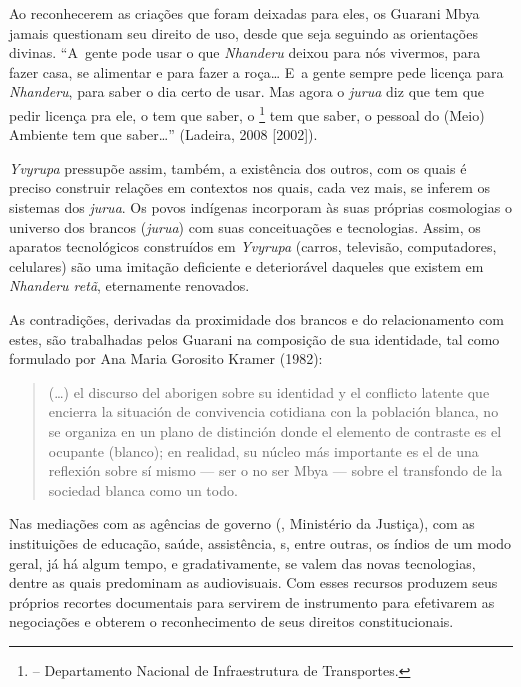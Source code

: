 Ao reconhecerem as criações que foram deixadas para eles, os Guarani
Mbya jamais questionam seu direito de uso, desde que seja seguindo as
orientações divinas. ``A~gente pode usar o que \emph{Nhanderu} deixou para nós
vivermos, para fazer casa, se alimentar e para fazer a roça\ldots{} E~a
gente sempre pede licença para \emph{Nhanderu}, para saber o dia certo de
usar. Mas agora o \emph{jurua} diz que tem que pedir licença pra ele, o 
tem que saber, o \footnote{ -- Departamento Nacional de
Infraestrutura de Transportes.} tem que saber, o pessoal do (Meio)
Ambiente tem que saber\ldots{}'' (Ladeira, 2008 [2002]).

\emph{Yvyrupa} pressupõe assim, também, a existência dos outros, com os quais é
preciso construir relações em contextos nos quais, cada vez mais, se
inferem os sistemas dos \emph{jurua}. Os povos indígenas incorporam às suas
próprias cosmologias o universo dos brancos (\emph{jurua}) com suas
conceituações e tecnologias. Assim, os aparatos tecnológicos
construídos em \emph{Yvyrupa} (carros, televisão, computadores, celulares) são
uma imitação deficiente e deteriorável daqueles que existem em \emph{Nhanderu
retã}, eternamente renovados.

As contradições, derivadas da proximidade dos brancos e do
relacionamento com estes, são trabalhadas pelos Guarani na composição
de sua identidade, tal como formulado por Ana Maria Gorosito Kramer
(1982): 

\begin{quote}
(\ldots{}) el discurso del aborigen sobre su identidad y el conflicto latente
que encierra la situación de convivencia cotidiana con la población
blanca, no se organiza en un plano de distinción donde el elemento de
contraste es el ocupante (blanco); en realidad, su núcleo más
importante es el de una reflexión sobre sí mismo --- ser o no ser Mbya ---
sobre el transfondo de la sociedad blanca como un todo.
\end{quote}

Nas mediações com as agências de governo (, Ministério da Justiça),
com as instituições de educação, saúde, assistência, s, entre
outras, os índios de um modo geral, já há algum tempo, e
gradativamente, se valem das novas tecnologias, dentre as quais
predominam as audiovisuais. Com esses recursos produzem seus próprios
recortes documentais para servirem de instrumento para efetivarem as
negociações e obterem o reconhecimento de seus direitos
constitucionais.

